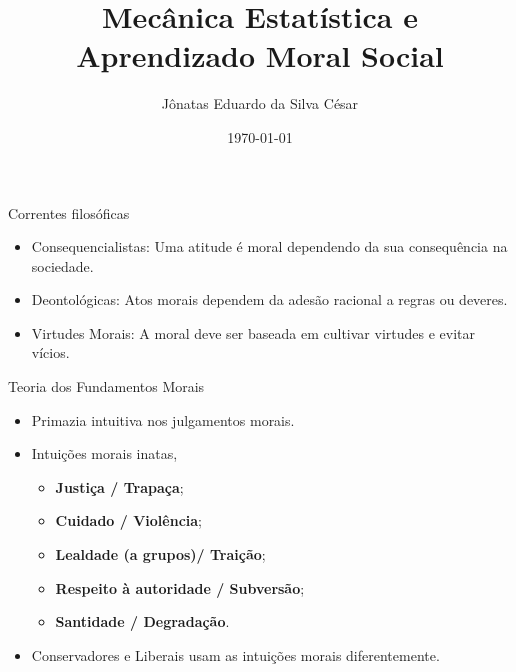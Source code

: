 \documentclass{beamer}
\begin{document}
    \title{Mecânica Estatística e \\Aprendizado Moral Social}%
    \author{Jônatas Eduardo da Silva César}
    \date{\today}
    
    \begin{frame}
        \titlepage
    \end{frame}%

    \begin{frame}{Correntes filosóficas}%
              
        \begin{itemize}
            \item <1-> Consequencialistas: Uma atitude é moral dependendo da
                sua consequência na sociedade.
            \item <2-> Deontológicas: Atos morais dependem da adesão racional
                a regras ou deveres.
            \item <3-> Virtudes Morais: A moral deve ser baseada em cultivar
                virtudes e evitar vícios. 
        \end{itemize}
    \end{frame}%
    
    \begin{frame}{Teoria dos Fundamentos Morais}%
        \begin{itemize}
            \item <1-> Primazia intuitiva nos julgamentos morais.
            \item <2-> Intuições morais inatas, 
            \begin{itemize}
                \item \textbf{Justiça / Trapaça};

                \item \textbf{Cuidado / Violência};

                \item \textbf{Lealdade (a grupos)/ Traição};

                \item \textbf{Respeito à autoridade / Subversão};

                \item \textbf{Santidade / Degradação}.
           \end{itemize}
       \item <3-> Conservadores e Liberais usam as intuições morais
           diferentemente.
        \end{itemize}

    \end{frame}%
\end{document}
